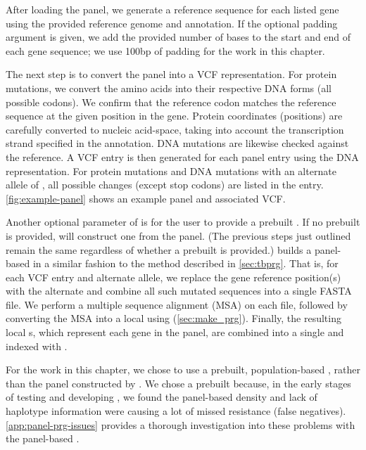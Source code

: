After loading the panel, we generate a reference sequence for each listed gene using the provided reference genome and annotation. If the optional padding argument is given, we add the provided number of bases to the start and end of each gene sequence; we use 100bp of padding for the work in this chapter.

The next step is to convert the panel into a VCF representation. For protein mutations, we convert the amino acids into their respective DNA forms (all possible codons). We confirm that the reference codon matches the reference sequence at the given position in the gene. Protein coordinates (positions) are carefully converted to nucleic acid-space, taking into account the transcription strand specified in the annotation. DNA mutations are likewise checked against the reference. A VCF entry is then generated for each panel entry using the DNA representation. For protein mutations and DNA mutations with an alternate allele of , all possible changes (except stop codons) are listed in the entry. \autoref{fig:example-panel} shows an example panel and associated VCF.

Another optional parameter of \drprg{}  is for the user to provide a prebuilt \panrg{}. If no prebuilt \panrg{} is provided, \drprg{} will construct one from the panel. (The previous steps just outlined remain the same regardless of whether a prebuilt \panrg{} is provided.) \drprg{} builds a panel-based \panrg{} in a similar fashion to the method described in \autoref{sec:tbprg}. That is, for each VCF entry and alternate allele, we replace the gene reference position(s) with the alternate and combine all such mutated sequences into a single FASTA file. We perform a multiple sequence alignment (MSA) on each file, followed by converting the MSA into a local \prg{} using \makeprg{} (\autoref{sec:make_prg}). Finally, the resulting local \prg{}s, which represent each gene in the panel, are combined into a single \panrg{} and indexed with \pandora{}.

For the work in this chapter, we chose to use a prebuilt, population-based \panrg{}, rather than the panel \panrg{} constructed by \drprg{}. We chose a prebuilt \panrg{} because, in the early stages of testing and developing \drprg{}, we found the panel-based \panrg{} density and lack of haplotype information were causing a lot of missed resistance (false negatives). \autoref{app:panel-prg-issues} provides a thorough investigation into these problems with the panel-based \panrg{}.

